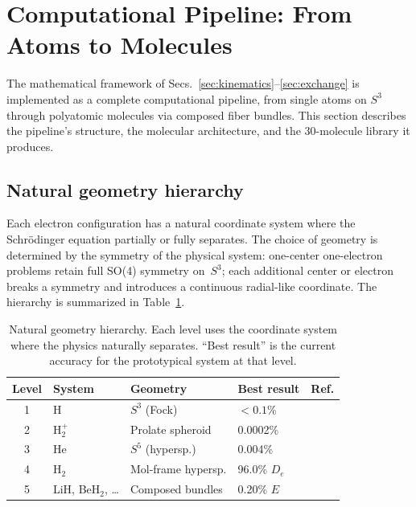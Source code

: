 \documentclass[aps,pra,twocolumn,superscriptaddress,longbibliography]{revtex4-2}
\begin{document}

\section{Computational Pipeline: From Atoms to Molecules}
\label{sec:pipeline}

The mathematical framework of
Secs.~\ref{sec:kinematics}--\ref{sec:exchange} is implemented as a
complete computational pipeline, from single atoms on $S^3$ through
polyatomic molecules via composed fiber bundles.  This section
describes the pipeline's structure, the molecular architecture, and the
30-molecule library it produces.

\subsection{Natural geometry hierarchy}

Each electron configuration has a natural coordinate system where the
Schr\"odinger equation partially or fully separates.  The choice of
geometry is determined by the symmetry of the physical system: one-center
one-electron problems retain full SO(4) symmetry on~$S^3$; each
additional center or electron breaks a symmetry and introduces a
continuous radial-like coordinate.  The hierarchy is summarized in
Table~\ref{tab:hierarchy}.

\begin{table}[t]
\caption{Natural geometry hierarchy.  Each level uses the coordinate
system where the physics naturally separates.  ``Best result'' is the
current accuracy for the prototypical system at that level.}
\label{tab:hierarchy}
\begin{ruledtabular}
\begin{tabular}{cllll}
Level & System & Geometry & Best result & Ref. \\
\hline
1 & H & $S^3$ (Fock) & $<0.1$\% & \cite{Paper7} \\
2 & H$_2^+$ & Prolate spheroid & 0.0002\% & \cite{Paper11} \\
3 & He & $S^5$ (hypersp.) & 0.004\% & \cite{Paper13} \\
4 & H$_2$ & Mol-frame hypersp. & 96.0\% $D_e$ & \cite{Paper15} \\
5 & LiH, BeH$_2$, \ldots & Composed bundles & 0.20\% $E$ & \cite{Paper17} \\
\end{tabular}
\end{ruledtabular}
\end{table}
\end{document}
